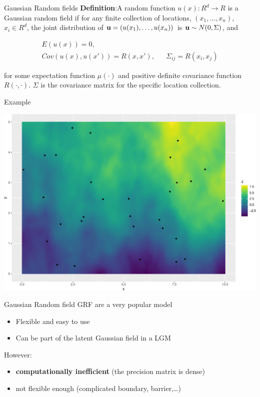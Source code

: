 \documentclass[
  ignorenonframetext,
]{beamer}
\begin{document}
\begin{frame}{Gaussian Random fields}
\protect\hypertarget{gaussian-random-fields}{}
\textbf{Definition}:A random function \(u(x):R^d\rightarrow R\) is a
Gaussian random field if for any finite collection of locations,
\((x_1,\dots, x_n)\), \(x_i\in R^d\), the joint distribution of
\({\bf u} = (u(x_1),\dots, u(x_n))\) is \({\bf u} \sim N(0, \Sigma)\),
and

\[
\begin{aligned}
E(u(x)) = 0, &\\ 
Cov(u(x), u(x')) = R(x, x'), && \Sigma_{ij} = R(x_i, x_j)
\end{aligned}
\]

for some expectation function \(\mu(\cdot)\) and positive definite
covariance function \(R(\cdot, \cdot)\). \(\Sigma\) is the covariance
matrix for the specific location collection.
\end{frame}

\begin{frame}{Example}
\protect\hypertarget{example}{}
\begin{center}\includegraphics[width=0.6\linewidth]{Part3_Spatial_files/figure-beamer/unnamed-chunk-6-1} \end{center}
\end{frame}

\begin{frame}{Gaussian Random field}
\protect\hypertarget{gaussian-random-field}{}
GRF are a very popular model

\begin{itemize}
\item
  Flexible and easy to use
\item
  Can be part of the latent Gaussian field in a LGM
\end{itemize}

However:

\begin{itemize}
\item
  \textbf{computationally inefficient} (the precision matrix is dense)
\item
  not flexible enough (complicated boundary, barrier,\ldots)
\end{itemize}
\end{frame}
\end{document}
